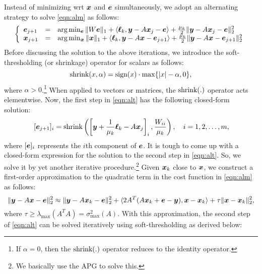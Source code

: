 \smallbreak
Instead of minimizing wrt ${\boldsymbol{x}}$ and $\boldsymbol{e}$ simultaneously, we adopt an alternating strategy to solve \eqref{eqn:alm} as follows:
\begin{equation}
\left \{
\begin{array}{lll}
\boldsymbol{e}_{j+1} & = & \arg \min_{\boldsymbol{e}}  \|W\boldsymbol{e}\|_1 + \langle {\boldsymbol\ell}_k, {\boldsymbol{y}} - A{\boldsymbol{x}}_j - \boldsymbol{e} \rangle + \frac{\mu_k}{2}\|{\boldsymbol{y}} - A{\boldsymbol{x}}_j - \boldsymbol{e}\|_2^2 \\
{\boldsymbol{x}}_{j+1} & = & \arg \min_{{\boldsymbol{x}}} \|{\boldsymbol{x}}\|_1 + \langle {\boldsymbol\ell}_k, {\boldsymbol{y}} - A{\boldsymbol{x}} - \boldsymbol{e}_{j+1} \rangle + \frac{\mu_k}{2}\|{\boldsymbol{y}} - A{\boldsymbol{x}} - \boldsymbol{e}_{j+1}\|_2^2
\end{array}
\right .
\label{eqn:alt}
\end{equation}
Before discussing the solution to the above iterations, we introduce the soft-thresholding (or shrinkage) operator for scalars as follows:
\begin{equation}
{\text{shrink}}(x,\alpha) = {\text{sign}}(x)\cdot \max\{|x| - \alpha, 0\},
\end{equation}
where $\alpha > 0$.\footnote{If $\alpha = 0$, then the ${\text{shrink}}(.)$ operator reduces to the identity operator.} When applied to vectors or matrices, the ${\text{shrink}}(.)$ operator acts elementwise. 
\smallbreak
Now, the first step in \eqref{eqn:alt} has the following closed-form solution:
\begin{equation}
\,[\boldsymbol{e}_{j+1}]_i  =  {\text{shrink}} \left(\left[ {\boldsymbol{y}} + \frac{1}{\mu_k}{\boldsymbol \ell}_k - A{\boldsymbol{x}}_j \right] _i, \frac{W_{ii}}{\mu_k}\right), \quad i = 1,2,\ldots,m,
\end{equation}
where $[\boldsymbol{e}]_i$ represents the $i$th component of $\boldsymbol{e}$.
\smallbreak
It is tough to come up with a closed-form expression for the solution to the second step in \eqref{eqn:alt}. So, we solve it by yet another iterative procedure.\footnote{We basically use the APG to solve this.} Given ${\boldsymbol{x}}_k$ close to ${\boldsymbol{x}}$, we construct a first-order approximation to the quadratic term in the cost function in \eqref{eqn:alm} as follows:
\begin{equation}
\|{\boldsymbol{y}} - A{\boldsymbol{x}} - \boldsymbol{e}\|_2^2 \approx \|{\boldsymbol{y}} - A{\boldsymbol{x}}_k - \boldsymbol{e}\|_2^2 + \langle 2A^T(A{\boldsymbol{x}}_k+\boldsymbol{e}-{\boldsymbol{y}}), {\boldsymbol{x}} - {\boldsymbol{x}}_k \rangle + \tau\|{\boldsymbol{x}}-{\boldsymbol{x}}_k\|_2^2,
\end{equation}
where $\tau \geq \lambda_\mathrm{max} (A^TA) = \sigma^2_\mathrm{max}(A)$. With this approximation, the second step of \eqref{eqn:alt} can be solved iteratively using soft-thresholding as derived below:
